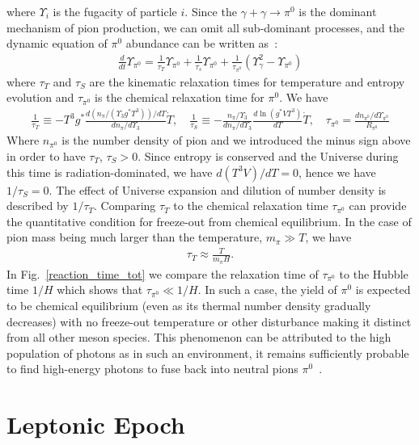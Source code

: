 \documentclass[universe,article,submit,moreauthors,pdftex,a4paper]{Definitions/mdpi}
\newcommand*{\rf}[1]{Fig.~{\ref{#1}}}
\begin{document}
where $\Upsilon_i$ is the fugacity of particle $i$. Since the $\gamma+\gamma\to \pi^0$ is the dominant mechanism of pion production, we can omit all sub-dominant processes, and the dynamic equation of $\pi^0$ abundance can be written as~\cite{Fromerth:2012fe}:
\begin{align}
\frac{d}{dt}\Upsilon_{\pi^0}=\frac{1}{\tau_T}\Upsilon_{\pi^0}+\frac{1}{\tau_s}\Upsilon_{\pi^0}+\frac{1}{\tau_{\pi^0}}\left(\Upsilon^2_\gamma-\Upsilon_{\pi^0}\right)
\end{align}
where $\tau_T$ and $\tau_S$ are the kinematic relaxation times for temperature and entropy evolution and $\tau_{\pi^0}$ is the chemical relaxation time for $\pi^0$. We have
\begin{align}
\frac{1}{\tau_T}\equiv -T^3g^*\frac{d (n_{\pi}/(\Upsilon_3
g^*T^3))/dT}{dn_{\pi}/d{\Upsilon_3}}{\dot T},\label{tauT} \quad
\frac{1}{\tau_{S}}\equiv
-\frac{n_{\pi}/\Upsilon_3}{dn_{\pi}/d{\Upsilon_3}}\frac{d\ln (g^*VT^3)}{dT}
\dot{T},\quad
\tau_{\pi^0}=\frac{dn_{\pi^0}/d\Upsilon_{\pi^0}}{R_{\pi^0}} 
\end{align}
Where $n_{\pi^0}$ is the number density of pion and we introduced the minus sign above in order to have $\tau_T$, $\tau_S>0$. Since entropy is conserved and the Universe during this time is radiation-dominated, we have $d(T^3V)/dT=0$, hence we have $1/\tau_S=0$. The effect of Universe expansion and dilution of number density is described by $1/\tau_T$. Comparing $\tau_T$ to the chemical relaxation time $\tau_{\pi^0}$ can provide the quantitative condition for freeze-out from chemical equilibrium. In the case of pion mass being much larger than the temperature, $m_{\pi}\gg T$, we have~\cite{Kuznetsova:2009xh}
\begin{align}
\tau_T\approx\frac{T}{m_{\pi}H}.
\end{align}
 In \rf{reaction_time_tot} we compare the relaxation time of $\tau_{\pi^0}$ to the Hubble time $1/H$ which shows that $\tau_{\pi^0}\ll 1/H$. In such a case, the yield of $\pi^0$ is expected to be chemical equilibrium (even as its thermal number density gradually decreases) with no freeze-out temperature or other disturbance making it distinct from all other meson species. This phenomenon can be attributed to the high population of photons as in such an environment, it remains sufficiently probable to find high-energy photons to fuse back into neutral pions $\pi^0$~\cite{Fromerth:2012fe}. 

\section{Leptonic Epoch} \label{sec:Leptonic}
\end{document}
